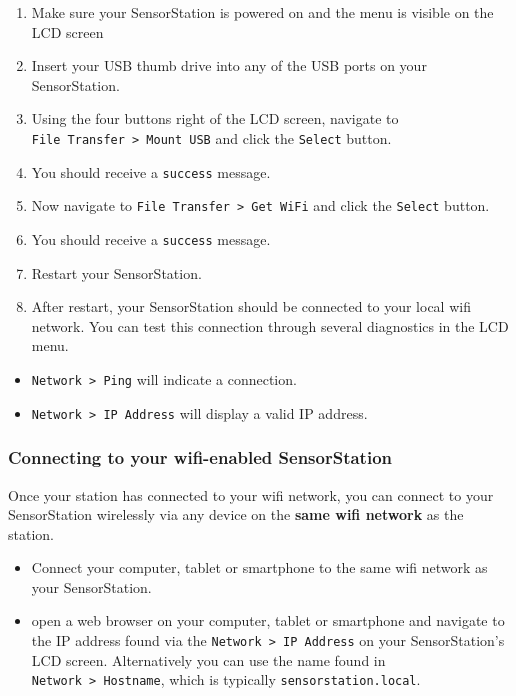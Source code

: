 \documentclass[
]{article}
\providecommand{\tightlist}{%
  \setlength{\itemsep}{0pt}\setlength{\parskip}{0pt}}
\begin{document}
\begin{enumerate}
\def\labelenumi{\arabic{enumi}.}
\tightlist
\item
  Make sure your SensorStation is powered on and the menu is visible on
  the LCD screen
\item
  Insert your USB thumb drive into any of the USB ports on your
  SensorStation.
\item
  Using the four buttons right of the LCD screen, navigate to
  \texttt{File\ Transfer\ \textgreater{}\ Mount\ USB} and click the
  \texttt{Select} button.
\item
  You should receive a \texttt{success} message.
\item
  Now navigate to \texttt{File\ Transfer\ \textgreater{}\ Get\ WiFi} and
  click the \texttt{Select} button.
\item
  You should receive a \texttt{success} message.
\item
  Restart your SensorStation.
\item
  After restart, your SensorStation should be connected to your local
  wifi network. You can test this connection through several diagnostics
  in the LCD menu.
\end{enumerate}

\begin{itemize}
\tightlist
\item
  \texttt{Network\ \textgreater{}\ Ping} will indicate a connection.
\item
  \texttt{Network\ \textgreater{}\ IP\ Address} will display a valid IP
  address.
\end{itemize}

\hypertarget{connecting-to-your-wifi-enabled-sensorstation}{%
\subsubsection{Connecting to your wifi-enabled
SensorStation}\label{connecting-to-your-wifi-enabled-sensorstation}}

Once your station has connected to your wifi network, you can connect to
your SensorStation wirelessly via any device on the \textbf{same wifi
network} as the station.

\begin{itemize}
\tightlist
\item
  Connect your computer, tablet or smartphone to the same wifi network
  as your SensorStation.
\item
  open a web browser on your computer, tablet or smartphone and navigate
  to the IP address found via the
  \texttt{Network\ \textgreater{}\ IP\ Address} on your SensorStation's
  LCD screen. Alternatively you can use the name found in
  \texttt{Network\ \textgreater{}\ Hostname}, which is typically
  \texttt{sensorstation.local}.
\end{itemize}
\end{document}
